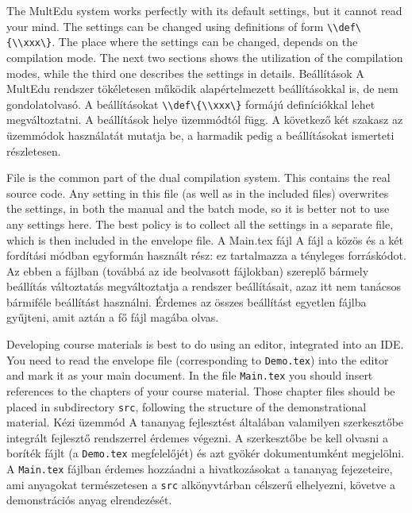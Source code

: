 





{
The MultEdu system works perfectly with its default settings, but it cannot read your mind.
The settings can be changed using definitions of form \lstinline|\\def\{\\xxx\}|.
The place where the settings can be changed, depends on the compilation mode.
The next two sections shows the utilization of the compilation modes,
while the third one describes the settings in details.
}
{Beállítások}
{
A MultEdu rendszer tökéletesen működik alapértelmezett beállításokkal is,
de nem gondolatolvasó. A beállításokat \lstinline|\\def\{\\xxx\}| formájú definíciókkal
lehet megváltoztatni. A beállítások helye üzemmódtól függ. A következő két szakasz 
az üzemmódok használatát mutatja be, a harmadik pedig a beállításokat ismerteti részletesen.
}

{
File  is the common part of the dual compilation system. 
This contains the real source code. Any setting in this file (as well as in the included files)
overwrites the settings, in both the manual and the batch mode, so it is better
not to use any settings here. The best policy is to collect all the settings
in a separate file, which is then included in the envelope file.
}
{A Main.tex fájl}
{
A  fájl a közös és a két fordítási módban egyformán használt rész:
ez tartalmazza a tényleges forráskódot. Az ebben a fájlban (továbbá az ide beolvasott fájlokban)
szereplő bármely beállítás változtatás megváltoztatja a rendszer beállításait,
azaz itt nem tanácsos bármiféle beállítást használni. Érdemes az összes beállítást 
egyetlen fájlba gyűjteni, amit aztán a fő fájl magába olvas.
}


{
Developing course materials is best to do using an editor, integrated into an IDE.
You need to read the envelope file (corresponding to \lstinline|Demo.tex|) into the
editor and mark it as your main document. 
In the file \lstinline|Main.tex| you should insert references to the chapters of your course material.
Those chapter files should be placed in subdirectory \lstinline|src|, following the structure of 
the demonstrational material.
}
{Kézi üzemmód}
{
A tananyag fejlesztést általában valamilyen szerkesztőbe integrált fejlesztő rendszerrel
érdemes végezni. A szerkesztőbe be kell olvasni a boríték fájlt (a \lstinline|Demo.tex| megfelelőjét)
és azt gyökér dokumentumként megjelölni.
A \lstinline|Main.tex| fájlban érdemes hozzáadni a hivatkozásokat a tananyag fejezeteire, ami anyagokat
természetesen a \lstinline|src| alkönyvtárban célszerű elhelyezni, követve a demonstrációs anyag elrendezését.
}

